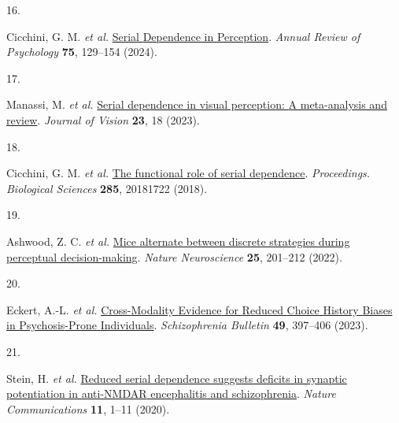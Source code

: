 \documentclass[
]{article}
\newlength{\cslhangindent}
\newlength{\csllabelwidth}
\newlength{\cslentryspacingunit} %
\newenvironment{CSLReferences}[2] %
 {%
  \setlength{\parindent}{0pt}
  \ifodd #1
  \let\oldpar\par
  \def\par{\hangindent=\cslhangindent\oldpar}
  \fi
  \setlength{\parskip}{#2\cslentryspacingunit}
 }%
 {}
\newcommand{\CSLLeftMargin}[1]{\parbox[t]{\csllabelwidth}{#1}}
\newcommand{\CSLRightInline}[1]{\parbox[t]{\linewidth - \csllabelwidth}{#1}\break}
\begin{document}
\begin{CSLReferences}{0}{0}
\leavevmode{}%
\CSLLeftMargin{16. }%
\CSLRightInline{Cicchini, G. M. \emph{et al.}
\href{https://doi.org/10.1146/annurev-psych-021523-104939}{Serial
{Dependence} in {Perception}}. \emph{Annual Review of Psychology}
\textbf{75}, 129--154 (2024).}

\leavevmode{}%
\CSLLeftMargin{17. }%
\CSLRightInline{Manassi, M. \emph{et al.}
\href{https://doi.org/10.1167/jov.23.8.18}{Serial dependence in visual
perception: {A} meta-analysis and review}. \emph{Journal of Vision}
\textbf{23}, 18 (2023).}

\leavevmode{}%
\CSLLeftMargin{18. }%
\CSLRightInline{Cicchini, G. M. \emph{et al.}
\href{https://doi.org/10.1098/rspb.2018.1722}{The functional role of
serial dependence}. \emph{Proceedings. Biological Sciences}
\textbf{285}, 20181722 (2018).}

\leavevmode{}%
\CSLLeftMargin{19. }%
\CSLRightInline{Ashwood, Z. C. \emph{et al.}
\href{https://doi.org/10.1038/s41593-021-01007-z}{Mice alternate between
discrete strategies during perceptual decision-making}. \emph{Nature
Neuroscience} \textbf{25}, 201--212 (2022).}

\leavevmode{}%
\CSLLeftMargin{20. }%
\CSLRightInline{Eckert, A.-L. \emph{et al.}
\href{https://doi.org/10.1093/schbul/sbac168}{Cross-{Modality}
{Evidence} for {Reduced} {Choice} {History} {Biases} in
{Psychosis}-{Prone} {Individuals}}. \emph{Schizophrenia Bulletin}
\textbf{49}, 397--406 (2023).}

\leavevmode{}%
\CSLLeftMargin{21. }%
\CSLRightInline{Stein, H. \emph{et al.}
\href{https://doi.org/10.1038/s41467-020-18033-3}{Reduced serial
dependence suggests deficits in synaptic potentiation in anti-{NMDAR}
encephalitis and schizophrenia}. \emph{Nature Communications}
\textbf{11}, 1--11 (2020).}

\end{CSLReferences}
\end{document}
